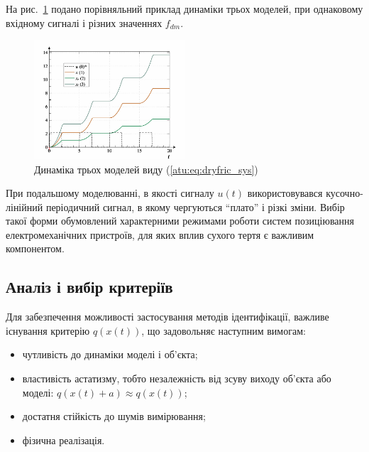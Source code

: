 На рис.~\ref{atu:f:fric_outs}
подано порівняльний приклад динаміки трьох моделей,
при однаковому вхідному сигналі і різних значеннях $f_{dm}$.

\begin{figure}[htb!]
  \centerline{
    \includegraphics[width=0.5\textwidth]{p/cha/fric/fric_outs1.png}
  }
  \caption{Динаміка трьох моделей виду (\ref{atu:eq:dryfric_sys})}
  \label{atu:f:fric_outs}
\end{figure}

При подальшому моделюванні, в якості сигналу
$u(t)$ використовувався кусочно-лінійний періодичний сигнал,
в якому чергуються ``плато'' і різкі зміни. Вибір такої форми
обумовлений характерними режимами роботи систем позиціювання
електромеханічних пристроїв, для яких вплив сухого тертя є важливим компонентом.


\subsection{Аналіз і вибір критеріїв} %

Для забезпечення можливості застосування методів ідентифікації, важливе
існування критерію $q(x(t))$, що задовольняє наступним вимогам:

\begin{itemize}

  \item
    чутливість до динаміки моделі і об'єкта;

  \item
    властивість астатизму,
    тобто незалежність від зсуву виходу об'єкта або моделі:
    \( q(x(t)+a ) \approx q( x(t) ) \);

  \item
    достатня стійкість до шумів вимірювання;

  \item
    фізична реалізація.

\end{itemize}


